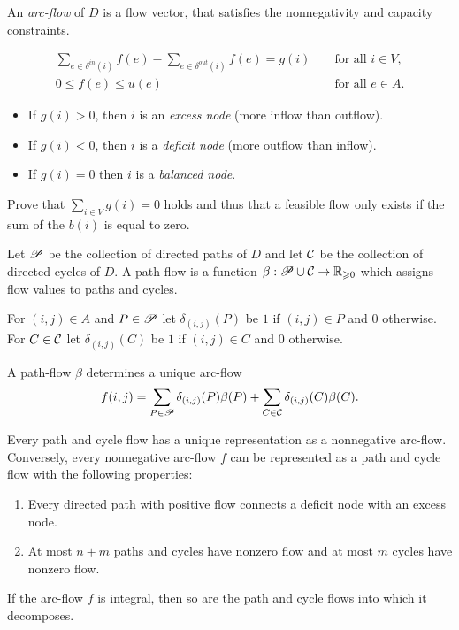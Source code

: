   An \emph{arc-flow} of $D$ is a flow vector, that satisfies the
  nonnegativity and capacity constraints. 
 
  \begin{eqnarray*}
        \sum_{e\in \delta^{in}(i)} f(e) -  \sum_{e \in \delta^{out}(i)} f(e)  =  g(i) & &   \text{ for all } i \in V,\\
        0 \leq f(e) \leq u(e)                 & &   \text{ for all }
        e \in A. 
  \end{eqnarray*}


  \begin{itemize}
  \item  If $g(i) >0$, then $i$ is an \emph{excess node} (more inflow than
    outflow).
  \item  If $g(i) <0$, then $i$ is a \emph{deficit node} (more outflow than
    inflow).
  \item  If $g(i) = 0$ then $i$ is a \emph{balanced node}.
  \end{itemize}
  
  
\begin{exercise}
   Prove that $\sum_{i \in V} g(i) = 0$ holds and thus that a 
   feasible flow only exists if the sum of the $b(i)$ is equal 
   to zero. 
\end{exercise}

  
  Let $\mathscr{P}$ be the collection of directed paths  of $D$ and
  let $\mathcal{C}$ be the collection of directed cycles of $D$. A
  path-flow is a function $\beta: \mathscr{P} \cup \mathcal{C} \to \mathbb{R}_{\geqslant0}$ which assigns
  flow values to paths and cycles. 

  For $(i,j)\in A$ and $P \in \mathscr{P}$ let $\delta_{(i,j)}(P)$ be $1$ if $(i,j) \in
  P$ and $0$ otherwise. For $C \in \mathcal{C}$ let $\delta_{(i,j)}(C)$ be $1$ if
  $(i,j)\in C$ and $0$ otherwise. 

  A path-flow $\beta$ determines a unique   arc-flow
  \begin{displaymath}
    f(i,j) = \sum_{P \in \mathscr{P}} \delta_{(i,j)}(P) \beta(P) + \sum_{C \in \mathcal{C}} \delta_{(i,j)}(C) \beta(C). 
  \end{displaymath}
    

  
  \begin{theorem}
    \label{f:thr:Decomp}
    Every path and cycle flow  has a unique representation
    as a  nonnegative arc-flow. Conversely, every nonnegative arc-flow
    $f$ can be represented as a path and cycle flow with the following
    properties:
    \begin{enumerate}
    \item Every directed path with positive flow connects a deficit
      node with an excess node.
    \item At most $n+m$ paths and cycles have nonzero flow and at most
      $m$ cycles have nonzero flow.
    \end{enumerate}
    If the arc-flow $f$ is integral, then so are the path and cycle
    flows into which it decomposes. 
  \end{theorem}

